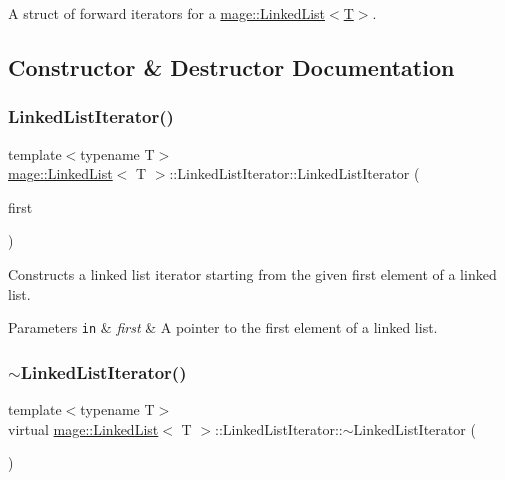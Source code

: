 A struct of forward iterators for a \hyperlink{classmage_1_1_linked_list}{mage\+::\+Linked\+List$<$\+T$>$}. 

\subsection{Constructor \& Destructor Documentation}
\hypertarget{structmage_1_1_linked_list_1_1_linked_list_iterator_a23efb79b0ab097c9d238feca8bab6e42}{}\label{structmage_1_1_linked_list_1_1_linked_list_iterator_a23efb79b0ab097c9d238feca8bab6e42} 
\subsubsection{\texorpdfstring{Linked\+List\+Iterator()}{LinkedListIterator()}}
{\footnotesize\ttfamily template$<$typename T$>$ \\
\hyperlink{classmage_1_1_linked_list}{mage\+::\+Linked\+List}$<$ T $>$\+::Linked\+List\+Iterator\+::\+Linked\+List\+Iterator (\begin{DoxyParamCaption}\item[{\hyperlink{structmage_1_1_linked_list_1_1_linked_list_element}{Linked\+List\+Element} $\ast$}]{first }\end{DoxyParamCaption})}

Constructs a linked list iterator starting from the given first element of a linked list.


\begin{DoxyParams}[1]{Parameters}
\mbox{\tt in}  & {\em first} & A pointer to the first element of a linked list. \\
\hline
\end{DoxyParams}
\hypertarget{structmage_1_1_linked_list_1_1_linked_list_iterator_a16631a6dc7aaaad10ba676f569da62b9}{}\label{structmage_1_1_linked_list_1_1_linked_list_iterator_a16631a6dc7aaaad10ba676f569da62b9} 
\subsubsection{\texorpdfstring{$\sim$\+Linked\+List\+Iterator()}{~LinkedListIterator()}}
{\footnotesize\ttfamily template$<$typename T$>$ \\
virtual \hyperlink{classmage_1_1_linked_list}{mage\+::\+Linked\+List}$<$ T $>$\+::Linked\+List\+Iterator\+::$\sim$\+Linked\+List\+Iterator (\begin{DoxyParamCaption}{ }\end{DoxyParamCaption})\hspace{0.3cm}{\ttfamily [virtual]}}

